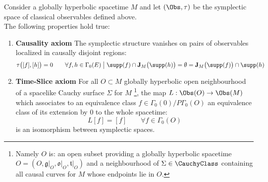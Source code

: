 \documentclass[Main]{subfiles}
\begin{document}
				\begin{theorem}\label{Teo:CausalityTimeSliceAxioms}
					Consider a globally hyperbolic spacetime $M$ and let $(\Obs,\tau)$ be the symplectic space of classical observables defined above.\\
					The following properties hold true:
					\begin{enumerate}
						\item\label{ItemCausAxiom} \textbf{Causality axiom}
							The symplectic structure vanishes on pairs of observables localized in causally disjoint regions:
							\begin{displaymath}
								\tau \big( [f],[h] \big) =0 \qquad
								\forall f,h \in \Gamma_0(E) \; \big\vert \; \supp(f) \cap \textbf{J}_M \big(\supp(h) \big) = \emptyset =
								\textbf{J}_M \big(\supp(f) \big) \cap \supp(h)
							\end{displaymath}
						\item\label{ItemTimeSliceAxiom} \textbf{Time-Slice axiom}
							For all $O \subset M$ globally hyperbolic open neighbourhood of a spacelike Cauchy surface $\Sigma$ for $M$ \footnote{Namely $O$ is: an open subset providing a globally hyperbolic spacetime $O = (O,\mathfrak{g}\vert_O,\mathfrak{o}\vert_O, \mathfrak{t}\vert_O)$ and a neighbourhood of $\Sigma \in \CauchyClass$ containing all causal curves for $M$ whose endpoints lie in $O$. },
							the map $L : \Obs( O) \rightarrow \Obs(M)$ which associates to an equivalence class $ f \in \Gamma_0(0)\big / P \Gamma_0(O)$
							an equivalence class of its extension by $0$ to the whole spacetime:
							\begin{displaymath}
							 L[f] = [f] \qquad \forall f \in \Gamma_0(O)
							\end{displaymath}
							is an isomorphism between symplectic spaces.
					\end{enumerate}
				\end{theorem}
\ifToninus
\end{document}

